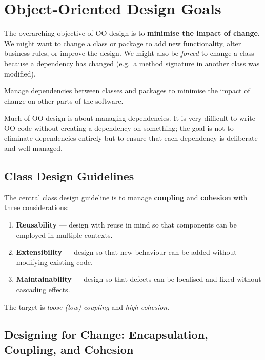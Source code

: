 \documentclass[11pt, a4paper, notitlepage]{report}
\theoremstyle{definition}
\theoremstyle{remark}
\theoremstyle{definition}
\begin{document}
\section{Object-Oriented Design Goals}
\label{sec:ch9-oo-goals}

The overarching objective of OO design is to \textbf{minimise the impact of change}.
We might want to change a class or package to add new functionality, alter business
rules, or improve the design. We might also be \emph{forced} to change a class because
a dependency has changed (e.g.\ a method signature in another class was modified).

\begin{keyresult}[title={Key Result: Core OO Design Objective}]
  Manage dependencies between classes and packages to minimise the impact of
  change on other parts of the software.
\end{keyresult}

Much of OO design is about managing dependencies. It is very difficult to write OO
code without creating a dependency on something; the goal is not to eliminate
dependencies entirely but to ensure that each dependency is deliberate and well-managed.

\subsection{Class Design Guidelines}
\label{subsec:ch9-class-guidelines}

The central class design guideline is to manage \textbf{coupling} and \textbf{cohesion}
with three considerations:
\begin{enumerate}
  \item \textbf{Reusability} --- design with reuse in mind so that components can be
        employed in multiple contexts.
  \item \textbf{Extensibility} --- design so that new behaviour can be added without
        modifying existing code.
  \item \textbf{Maintainability} --- design so that defects can be localised and fixed
        without cascading effects.
\end{enumerate}

The target is \emph{loose (low) coupling} and \emph{high cohesion}.

\subsection{Designing for Change: Encapsulation, Coupling, and Cohesion}
\label{subsec:ch9-design-for-change}
\end{document}
